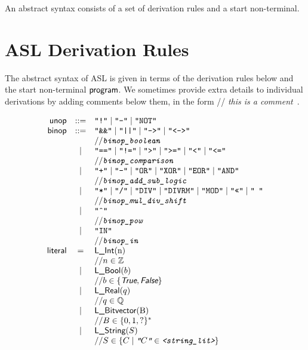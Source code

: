 \documentclass{book}
\begin{document}
An abstract syntax consists of a set of derivation rules and a start non-terminal.

\newcommand\ASTComment[1]{// \textit{#1}\ }

\section{ASL Derivation Rules}

The abstract syntax of ASL is given in terms of the derivation rules below and the start non-terminal $\textsf{program}$.
%
We sometimes provide extra details to individual derivations by adding comments below them, in the form \ASTComment{this is a comment}.

\[
\begin{array}{rcl}
\unop &::=& \texttt{"!"} \;|\; \texttt{"-"} \;|\; \texttt{"NOT"} \\
\binop &::=& \texttt{"\&\&"} \;|\; \texttt{"||"} \;|\; \texttt{"-->"} \;|\;  \texttt{"<->"}  \\
 & & \ASTComment{\texttt{binop\_boolean}}\\

 &|& \texttt{"=="} \;|\; \texttt{"!="}  \;|\; \texttt{">"}  \;|\; \texttt{">="} \;|\; \texttt{"<"} \;|\; \texttt{"<="}   \\
 & & \ASTComment{\texttt{binop\_comparison}}\\

 &|& \texttt{"+"} \;|\; \texttt{"-"}  \;|\; \texttt{"OR"}  \;|\; \texttt{"XOR"} \;|\; \texttt{"EOR"} \;|\; \texttt{"AND"}   \\
 & & \ASTComment{\texttt{binop\_add\_sub\_logic}}\\

 &|& \texttt{"*"} \;|\; \texttt{"/"}  \;|\; \texttt{"DIV"}  \;|\; \texttt{"DIVRM"} \;|\; \texttt{"MOD"}  \;|\; \texttt{"<<"}  \;|\; \texttt{"\>\>"}    \\
 & & \ASTComment{\texttt{binop\_mul\_div\_shift}}\\

 &|& \texttt{"\^{}"}   \\
 & & \ASTComment{\texttt{binop\_pow}}\\

 &|& \texttt{"IN"}   \\
 & & \ASTComment{\texttt{binop\_in}}\\

\literal &=& \lint($n$) \\
 & & \ASTComment{$n \in \Z$}\\
 &|& \lbool(b) \\
 & & \ASTComment{$b \in \{\True, \False\}$}\\
 &|& \lreal(q)  \\
 & & \ASTComment{$q \in \Q$}\\
 &|& \lbitvector($B$)   \\
 & & \ASTComment{$B \in \{0, 1, ?\}^*$}\\
 &|& \lstring(S)\\
 & & \ASTComment{$S \in \{C \;|\; \texttt{"$C$"} \in \texttt{<string\_lit>}\} $}\\
\end{array}
\]
\end{document}
